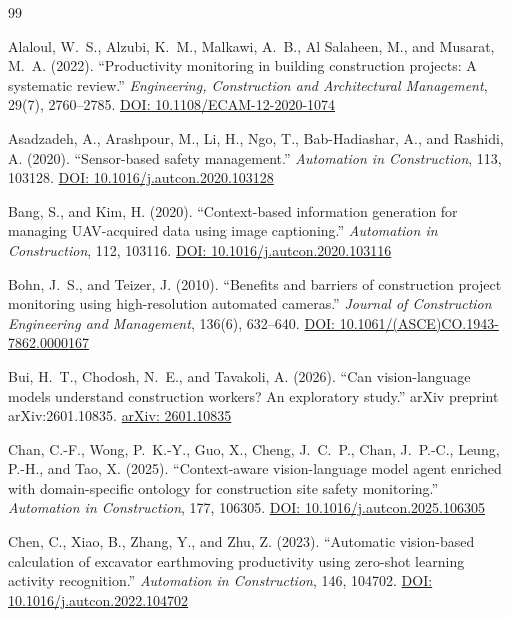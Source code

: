 \documentclass[10pt,letterpaper]{article}
\begin{document}
\begin{thebibliography}{99}

 Alaloul, W.~S., Alzubi, K.~M., Malkawi, A.~B., Al Salaheen, M., and Musarat, M.~A. (2022). ``Productivity monitoring in building construction projects: A systematic review.'' \textit{Engineering, Construction and Architectural Management}, 29(7), 2760--2785. \href{https://doi.org/10.1108/ECAM-12-2020-1074}{DOI: 10.1108/ECAM-12-2020-1074}

 Asadzadeh, A., Arashpour, M., Li, H., Ngo, T., Bab-Hadiashar, A., and Rashidi, A. (2020). ``Sensor-based safety management.'' \textit{Automation in Construction}, 113, 103128. \href{https://doi.org/10.1016/j.autcon.2020.103128}{DOI: 10.1016/j.autcon.2020.103128}

 Bang, S., and Kim, H. (2020). ``Context-based information generation for managing UAV-acquired data using image captioning.'' \textit{Automation in Construction}, 112, 103116. \href{https://doi.org/10.1016/j.autcon.2020.103116}{DOI: 10.1016/j.autcon.2020.103116}

 Bohn, J.~S., and Teizer, J. (2010). ``Benefits and barriers of construction project monitoring using high-resolution automated cameras.'' \textit{Journal of Construction Engineering and Management}, 136(6), 632--640. \href{https://doi.org/10.1061/(ASCE)CO.1943-7862.0000167}{DOI: 10.1061/(ASCE)CO.1943-7862.0000167}

 Bui, H.~T., Chodosh, N.~E., and Tavakoli, A. (2026). ``Can vision-language models understand construction workers? An exploratory study.'' arXiv preprint arXiv:2601.10835. \href{https://arxiv.org/abs/2601.10835}{arXiv: 2601.10835}

 Chan, C.-F., Wong, P.~K.-Y., Guo, X., Cheng, J.~C.~P., Chan, J.~P.-C., Leung, P.-H., and Tao, X. (2025). ``Context-aware vision-language model agent enriched with domain-specific ontology for construction site safety monitoring.'' \textit{Automation in Construction}, 177, 106305. \href{https://doi.org/10.1016/j.autcon.2025.106305}{DOI: 10.1016/j.autcon.2025.106305}

 Chen, C., Xiao, B., Zhang, Y., and Zhu, Z. (2023). ``Automatic vision-based calculation of excavator earthmoving productivity using zero-shot learning activity recognition.'' \textit{Automation in Construction}, 146, 104702. \href{https://doi.org/10.1016/j.autcon.2022.104702}{DOI: 10.1016/j.autcon.2022.104702}


\end{thebibliography}
\end{document}
